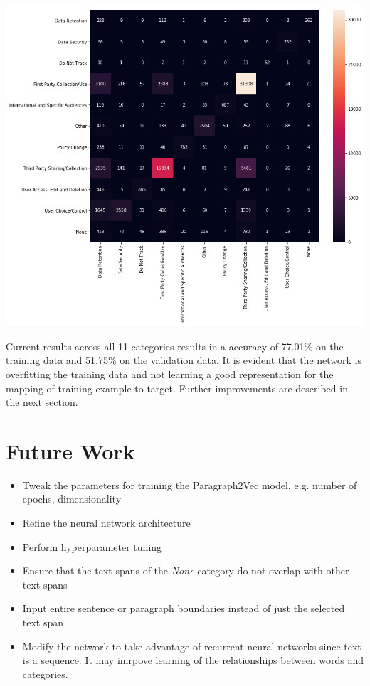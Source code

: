 \documentclass[12pt, letterpaper]{article}
\begin{document}
\includegraphics[width=\linewidth]{confusion-matrix}

Current results across all 11 categories results in a accuracy of 77.01\% on the training data and 51.75\% on the validation data. It is evident that the network is overfitting the training data and not learning a good representation for the mapping of training example to target. Further improvements are described in the next section.

\section{Future Work}
\begin{itemize}
\item Tweak the parameters for training the Paragraph2Vec model, e.g. number of epochs, dimensionality
\item Refine the neural network architecture
\item Perform hyperparameter tuning
\item Ensure that the text spans of the \textit{None} category do not overlap with other text spans
\item Input entire sentence or paragraph boundaries instead of just the selected text span
\item Modify the network to take advantage of recurrent neural networks since text is a sequence. It may imrpove learning of the relationships between words and categories.
\end{itemize}

\newpage

 
\end{document}
